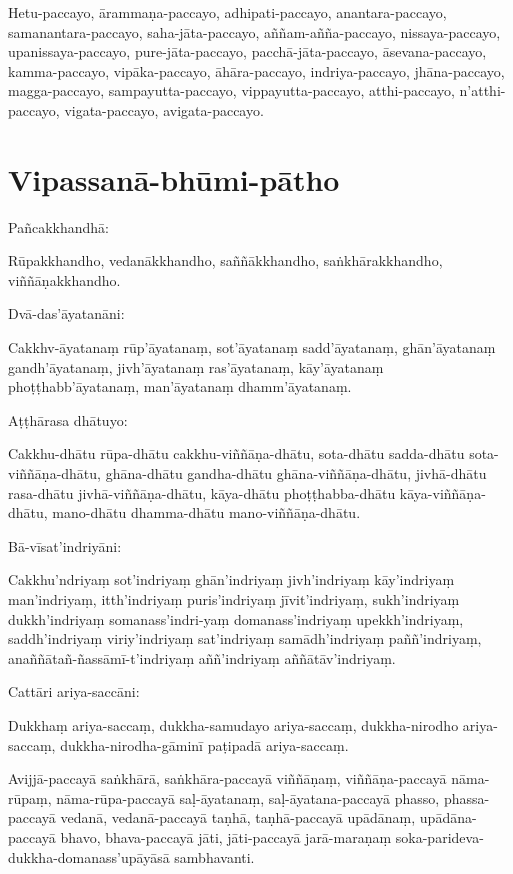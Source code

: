 \begin{paritta}
Hetu-paccayo, ārammaṇa-paccayo, adhipati-paccayo, anantara-paccayo,
samanantara-paccayo, saha-jāta-paccayo, aññam-añña-paccayo,
nissaya-paccayo, upanissaya-paccayo, pure-jāta-paccayo,
pacchā-jāta-paccayo, āsevana-paccayo, kamma-paccayo, vipāka-paccayo,
āhāra-paccayo, indriya-paccayo, jhāna-paccayo, magga-paccayo,
sampayutta-paccayo, vippayutta-paccayo, atthi-paccayo, n'atthi-paccayo,
vigata-paccayo, avigata-paccayo.
\end{paritta}

\chapter{Vipassanā-bhūmi-pātho}%


Pañcakkhandhā:

Rūpakkhandho, vedanākkhandho, saññākkhandho, saṅkhārakkhandho,
viññāṇakkhandho.

Dvā-das'āyatanāni:

Cakkhv-āyatanaṃ rūp'āyatanaṃ, sot'āyatanaṃ sadd'āyatanaṃ, ghān'āyatanaṃ
gandh'āyatanaṃ, jivh'āyatanaṃ ras'āyatanaṃ, kāy'āyatanaṃ
phoṭṭhabb'āyatanaṃ, man'āyatanaṃ dhamm'āyatanaṃ.

Aṭṭhārasa dhātuyo:

Cakkhu-dhātu rūpa-dhātu cakkhu-viññāṇa-dhātu, sota-dhātu sadda-dhātu
sota-viññāṇa-dhātu, ghāna-dhātu gandha-dhātu ghāna-viññāṇa-dhātu,
jivhā-dhātu rasa-dhātu jivhā-viññāṇa-dhātu, kāya-dhātu phoṭṭhabba-dhātu
kāya-viññāṇa-dhātu, mano-dhātu dhamma-dhātu mano-viññāṇa-dhātu.

Bā-vīsat'indriyāni:

Cakkhu'ndriyaṃ sot'indriyaṃ ghān'indriyaṃ jivh'indriyaṃ kāy'indriyaṃ
man'indriyaṃ, itth'indriyaṃ puris'indriyaṃ jīvit'indriyaṃ, sukh'indriyaṃ
dukkh'indriyaṃ somanass'indri-yaṃ domanass'indriyaṃ upekkh'indriyaṃ,
saddh'indriyaṃ viriy'indriyaṃ sat'indriyaṃ samādh'indriyaṃ
paññ'indriyaṃ, anaññātañ-ñassāmī-t'indriyaṃ aññ'indriyaṃ
aññātāv'indriyaṃ.

Cattāri ariya-saccāni:

Dukkhaṃ ariya-saccaṃ, dukkha-samudayo ariya-saccaṃ, dukkha-nirodho
ariya-saccaṃ, dukkha-nirodha-gāminī paṭipadā ariya-saccaṃ.

Avijjā-paccayā saṅkhārā, saṅkhāra-paccayā viññāṇaṃ, viññāṇa-paccayā
nāma-rūpaṃ, nāma-rūpa-paccayā saḷ-āyatanaṃ, saḷ-āyatana-paccayā phasso,
phassa-paccayā vedanā, vedanā-paccayā taṇhā, taṇhā-paccayā upādānaṃ,
upādāna-paccayā bhavo, bhava-paccayā jāti, jāti-paccayā jarā-maraṇaṃ
soka-parideva-dukkha-domanass'upāyāsā sambhavanti.


